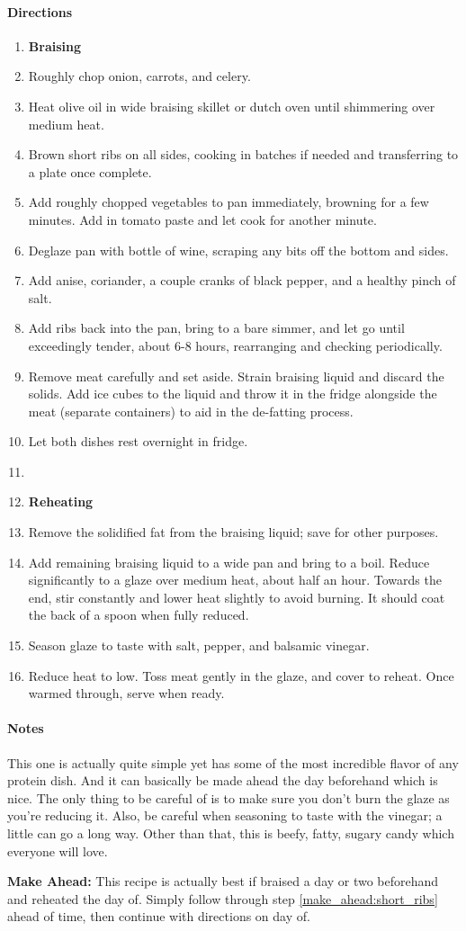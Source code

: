 \documentclass[12pt]{article}
\newenvironment*{directions}
	{
		\paragraph*{Directions}
		\begin{enumerate}
	}
	{
		\end{enumerate}
	}
\newenvironment*{notes}
	{
		\paragraph*{Notes}
		\begin{adjustwidth}{1cm}{}
	}
	{
		\end{adjustwidth}
	}
\begin{document}
	\begin{directions}
		\item[] \textbf{Braising}
		\item Roughly chop onion, carrots, and celery.
		\item Heat olive oil in wide braising skillet or dutch oven until shimmering over medium heat.
		\item Brown short ribs on all sides, cooking in batches if needed and transferring to a plate once complete.
		\item Add roughly chopped vegetables to pan immediately, browning for a few minutes. Add in tomato paste and let cook for another minute.
		\item Deglaze pan with bottle of wine, scraping any bits off the bottom and sides.
		\item Add anise, coriander, a couple cranks of black pepper, and a healthy pinch of salt.
		\item Add ribs back into the pan, bring to a bare simmer, and let go until exceedingly tender, about 6-8 hours, rearranging and checking periodically.
		\item Remove meat carefully and set aside. Strain braising liquid and discard the solids. Add ice cubes to the liquid and throw it in the fridge alongside the meat (separate containers) to aid in the de-fatting process.
		\item Let both dishes rest overnight in fridge. \label{make_ahead:short_ribs}
		\item[] \hfill
		\item[] \textbf{Reheating}
		\item Remove the solidified fat from the braising liquid; save for other purposes.
		\item Add remaining braising liquid to a wide pan and bring to a boil. Reduce significantly to a glaze over medium heat, about half an hour. Towards the end, stir constantly and lower heat slightly to avoid burning. It should coat the back of a spoon when fully reduced.
		\item Season glaze to taste with salt, pepper, and balsamic vinegar.
		\item Reduce heat to low. Toss meat gently in the glaze, and cover to reheat. Once warmed through, serve when ready.
	\end{directions}
	
	\begin{notes}
		This one is actually quite simple yet has some of the most incredible flavor of any protein dish. And it can basically be made ahead the day beforehand which is nice. The only thing to be careful of is to make sure you don't burn the glaze as you're reducing it. Also, be careful when seasoning to taste with the vinegar; a little can go a long way. Other than that, this is beefy, fatty, sugary candy which everyone will love.
		
		\textbf{Make Ahead:} This recipe is actually best if braised a day or two beforehand and reheated the day of. Simply follow through step \ref{make_ahead:short_ribs} ahead of time, then continue with directions on day of.
	\end{notes}
	
\end{document}
